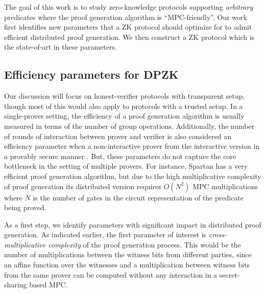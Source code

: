 The goal of this work is to study zero-knowledge protocols supporting \textit{arbitrary} predicates where the proof generation algorithm is ``MPC-friendly''. %
Our work first identifies new parameters that a ZK protocol should optimize for to admit efficient distributed proof generation. We then construct a ZK protocol which is the state-of-art in these parameters.

\subsection{Efficiency parameters for DPZK}
Our discussion will focus on honest-verifier protocols with transparent setup, though most of this would also apply to protocols with a trusted setup. %
In a single-prover setting, the efficiency of a proof generation algorithm is usually measured in terms of the number of group operations. Additionally, the number of rounds of interaction between prover and verifier is also considered an efficiency parameter when a non-interactive prover from the interactive version in a provably secure manner \cite{BCS16}. But, these parameters do not capture the core bottleneck in the setting of multiple provers. For instance, Spartan \cite{spartan} has a very efficient proof generation algorithm, but due to the high multiplicative complexity of proof generation its distributed version requires $O(N^2)$ MPC multiplications where $N$ is the number of gates in the circuit representation of the predicate being proved. %

As a first step, we identify parameters with significant impact in distributed proof generation. 
As indicated earlier, the first parameter of interest is \textit{cross-multiplicative complexity} of the proof generation process. 
This would be the number of multiplications between the witness bits from different parties, since an affine function over the witnesses and a multiplication between witness bits from the same prover can be computed without any interaction in a secret-sharing based MPC.

